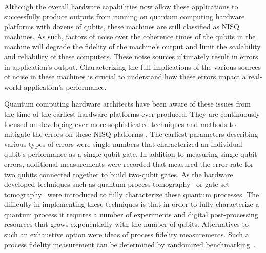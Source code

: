 Although the overall hardware capabilities now allow these applications to successfully produce outputs from running on quantum computing hardware platforms with dozens of qubits, these machines are still classified as NISQ machines.  As such, factors of noise over the coherence times of the qubits in the machine will degrade the fidelity of the machine’s output and limit the scalability and reliability of these computers.  These noise sources ultimately result in errors in application’s output.  Characterizing the full implications of the various sources of noise in these machines is crucial to understand how these errors impact a real-world application’s performance.

Quantum computing hardware architects have been aware of these issues from the time of the earliest hardware platforms ever produced.  They are continuously focused on developing ever more sophisticated techniques and methods to mitigate the errors on these NISQ platforms {\color{red}{KYA: Cite a few error mitigation papers}}.  The earliest parameters describing various types of errors were single numbers that characterized an individual qubit’s performance as a single qubit gate.  In addition to measuring single qubit errors, additional measurements were recorded that measured the error rate for two qubits connected together to build two-qubit gates.  As the hardware developed techniques such as 
quantum process tomography~\cite{ref:Chuang1997} or gate set tomography~\cite{ref:Merkel2012,ref:Blume-Kohout2013,ref:Blume-Kohout2017} were introduced to fully characterize these quantum processes.  The difficulty in implementing these techniques is that in order to fully characterize a quantum process it requires a number of experiments and digital post-processing resources that grows exponentially with the number of qubits.  Alternatives to such an exhaustive option were ideas of process fidelity measurements.  Such a process fidelity measurement can be determined by randomized benchmarking~\cite{ref:Emerson2005,ref:Dankert2009,ref:Magesan2011}.
